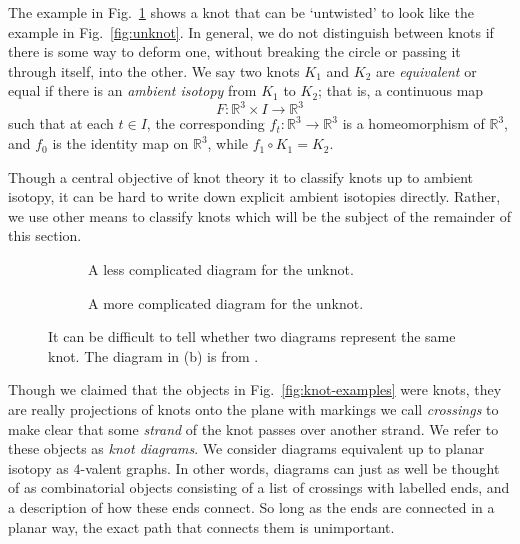 \documentclass[12pt]{report}
\newcommand{\R}{\mathbb{R}}
\theoremstyle{upright}
\begin{document}
The example in Fig.~\ref{fig:unknot-twisted} shows a knot that can be `untwisted' to look like the example in Fig.~\ref{fig:unknot}. In general, we do not distinguish between knots if there is some way to deform one, without breaking the circle or passing it through itself, into the other. We say two knots $K_{1}$ and $K_{2}$ are \textit{equivalent} or equal if there is an \textit{ambient isotopy} from $K_{1}$ to $K_{2}$; that is, a continuous map
\[F: \R^{3} \times I \longrightarrow \R^{3}\]
such that at each $t \in I$, the corresponding $f_{t}: \R^{3} \longrightarrow \R^{3}$ is a homeomorphism of $\R^{3}$, and $f_{0}$ is the identity map on $\R^{3}$, while $f_{1} \circ K_{1} = K_{2}$.

Though a central objective of knot theory it to classify knots up to ambient isotopy, it can be hard to write down explicit ambient isotopies directly. Rather, we use other means to classify knots which will be the subject of the remainder of this section.

\begin{figure}[hbt]
	\centering
	\hspace*{\fill}
	\begin{subfigure}[b]{0.35 \textwidth}
		\centering
		\def\svgscale{0.2}
		
		\caption{A less complicated diagram for the unknot.}
		\label{fig:unknot-twisted}
	\end{subfigure}
	\hspace*{\fill}
	\begin{subfigure}[b]{0.35 \textwidth}
		\centering
		\def\svgscale{0.2}
		
		\caption{A more complicated diagram for the unknot.}
		\label{fig:unknot-goertiz}
	\end{subfigure}
	\hspace*{\fill}
	\caption{It can be difficult to tell whether two diagrams represent the same knot. The diagram in (b) is from \cite{notes-on-knot-theory}.}
	\label{fig:more-unknots}
\end{figure}

Though we claimed that the objects in Fig.~\ref{fig:knot-examples} were knots, they are really projections of knots onto the plane with markings we call \textit{crossings} to make clear that some \textit{strand} of the knot passes over another strand. We refer to these objects as \textit{knot diagrams}. We consider diagrams equivalent up to planar isotopy as $4$-valent graphs. In other words, diagrams can just as well be thought of as combinatorial objects consisting of a list of crossings with labelled ends, and a description of how these ends connect. So long as the ends are connected in a planar way, the exact path that connects them is unimportant.
\end{document}
